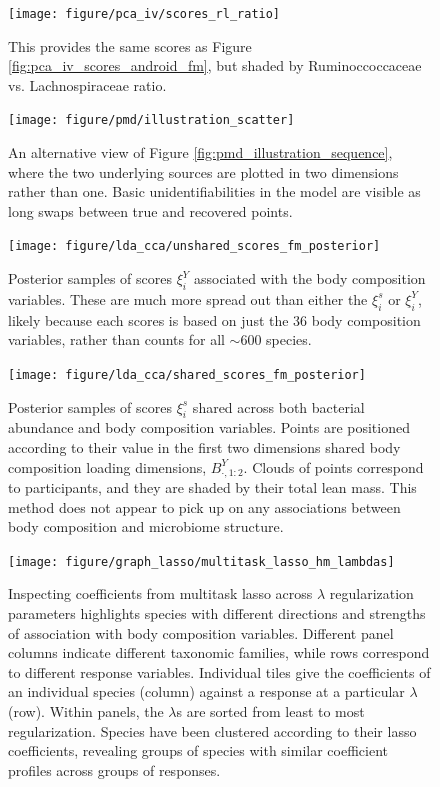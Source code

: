 \documentclass[14pt]{extarticle}
\begin{document}
\begin{figure}
  \centering
  \texttt{[image: figure/pca\_iv/scores\_rl\_ratio]}
  \caption{This provides the same scores as Figure
    \ref{fig:pca_iv_scores_android_fm}, but shaded by Ruminoccoccaceae vs.
    Lachnospiraceae ratio. \label{fig:pca_iv_scores_rl_ratio} }
\end{figure}

\begin{figure}
  \centering
  \texttt{[image: figure/pmd/illustration\_scatter]}
  \caption{An alternative view of Figure \ref{fig:pmd_illustration_sequence},
    where the two underlying sources are plotted in two dimensions rather than
    one. Basic unidentifiabilities in the model are visible as long swaps
    between true and recovered points. \label{fig:pmd_illustration_scatter} }
\end{figure}

 \begin{figure}
   \centering
   \texttt{[image: figure/lda\_cca/unshared\_scores\_fm\_posterior]}
   \caption{Posterior samples of scores $\xi^{Y}_i$ associated with the body
     composition variables. These are much more spread out than either the
     $\xi_{i}^s$ or $\xi_{i}^Y$, likely because each scores is based on just the
     36 body composition variables, rather than counts for all $\sim 600$
     species.
     \label{fig:lda_cca_unshared_scores_lm_posterior} }
 \end{figure}

 \begin{figure}
   \centering
   \texttt{[image: figure/lda\_cca/shared\_scores\_fm\_posterior]}
   \caption{Posterior samples of scores $\xi^{s}_i$ shared across both bacterial
     abundance and body composition variables. Points are positioned according
     to their value in the first two dimensions shared body composition loading
     dimensions, $B^{Y}_{\cdot, 1:2}$. Clouds of points correspond to
     participants, and they are shaded by their total lean mass. This method
     does not appear to pick up on any associations between body composition and
     microbiome structure.
 \label{fig:lda_cca_shared_scores_lm_posterior} }
 \end{figure}

\begin{figure}
  \centering
  \texttt{[image: figure/graph\_lasso/multitask\_lasso\_hm\_lambdas]}
  \caption{ Inspecting coefficients from multitask lasso across $\lambda$
    regularization parameters highlights species with different directions and
    strengths of association with body composition variables. Different panel
    columns indicate different taxonomic families, while rows correspond to
    different response variables. Individual tiles give the coefficients of an
    individual species (column) against a response at a particular $\lambda$
    (row). Within panels, the $\lambda$s are sorted from least to most
    regularization. Species have been clustered according to their lasso
    coefficients, revealing groups of species with similar coefficient profiles
    across groups of responses.
    \label{fig:graph_lasso_multitask_lasso_hm_lambdas} }
\end{figure}
\end{document}
